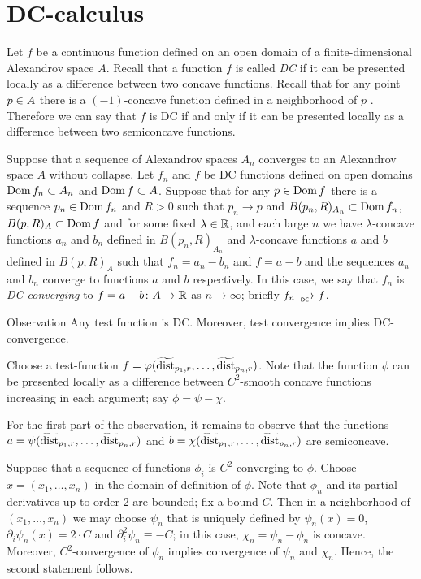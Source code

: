  
 

  
 
\section{DC-calculus}\label{sec:DC}

Let $f$ be a continuous function defined on an open domain of a finite-dimensional Alexandrov space $A$.
Recall that a function $f$ is called \emph{DC} if it can be presented locally as a difference between two concave functions.
Recall that for any point $p\zz\in A$ there is a $(-1)$-concave function defined in a  neighborhood  of $p$ \cite[3.6]{PerMorse}.
Therefore we can say that $f$ is DC if and only if it can be presented locally as a difference between two semiconcave functions. 

Suppose that a sequence of Alexandrov spaces $A_n$ converges to an Alexandrov space $A$ without collapse.
Let $f_n$ and $f$ be DC functions defined on open domains $\Dom f_n\zz\subset A_n$ and $\Dom f \zz\subset A$.
Suppose that for any $p\in \mathop{\rm Dom} f$ there is a sequence $p_n\in \mathop{\rm Dom} f_n$ and $R>0$ such that $p_n\to p$ and $B(p_n,R)_{A_n}\subset \mathop{\rm Dom} f_n$, $B(p,R)_{A}\subset\mathop{\rm Dom} f$
and for some fixed $\lambda\in\mathbb{R}$, and each large $n$ we have $\lambda$-concave functions $a_n$ and $b_n$ defined in $B(p_n,R)_{A_n}$ and $\lambda$-concave functions $a$ and $b$ defined in $B(p,R)_{A}$
such that $f_n=a_n-b_n$ and $f=a-b$ and the sequences
$a_n$ and $b_n$ converge to functions $a$ and $b$ respectively.
In this case, we say that $f_n$ is \emph{DC-converging} to $f=a-b\colon A\to \mathbb{R}$ as $n\to\infty$; briefly $f_n\DCto f$.

\begin{thm}{Observation}\label{obs:test-DC}
Any test function is DC.
Moreover, test convergence implies DC-convergence. 
\end{thm}

Choose a test-function $f=\varphi(\widetilde{\operatorname{\rm dist}}_{p_1,r},\dots,\widetilde{\operatorname{\rm dist}}_{p_n,r})$.
Note that the function $\phi$ can be presented locally as a difference between $C^2$-smooth concave functions increasing in each argument; say $\phi=\psi-\chi$.

For the first part of the observation, it remains to observe that the functions $a=\psi(\widetilde{\operatorname{\rm dist}}_{p_1,r},\dots,\widetilde{\operatorname{\rm dist}}_{p_n,r})$ and $b=\chi(\widetilde{\operatorname{\rm dist}}_{p_1,r},\dots,\widetilde{\operatorname{\rm dist}}_{p_n,r})$ are semiconcave.

Suppose that a sequence of functions $\phi_i$ is $C^2$-converging to $\phi$.
Choose $x=(x_1,\dots,x_n)$ in the domain of definition of $\phi$.
Note that $\phi_n$ and its partial derivatives up to order 2 are bounded;
fix a bound $C$.
Then in a neighborhood of $(x_1,\dots,x_n)$ we may choose $\psi_n$ that is uniquely defined by $\psi_n(x)=0$, $\partial_i\psi_n(x)=2\cdot C$ and $\partial_i^2\psi_n\equiv -C$; in this case, $\chi_n=\psi_n-\phi_n$ is concave.
Moreover, $C^2$-convergence of $\phi_n$ implies convergence of $\psi_n$ and $\chi_n$.
Hence, the second statement follows.
\qeds

